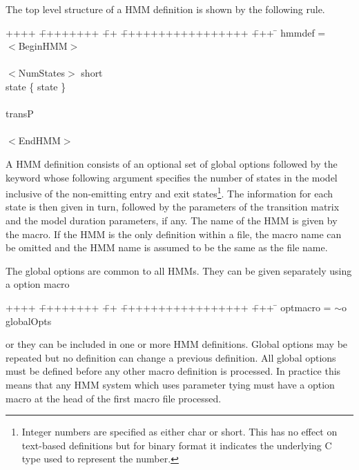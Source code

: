 The top level structure of a HMM definition is shown by the following
rule. 
{\sf
\begin{tabbing}
++++ \= ++++++++ \= ++ \= +++++++++++++++++ \= +++ \=  \kill
\>  hmmdef =  \\
\>\>         $<$BeginHMM$>$ \\
\>\>\>          [ globalOpts ] \\
\>\>\>          $<$NumStates$>$ short \\
\>\>\>          state \{ state \} \\
\>\>\>          [ regTree ] \\
\>\>\>          transP \\
\>\>\>          [ duration ] \\
\>\>         $<$EndHMM$>$ 
\end{tabbing}
}
A HMM definition consists of an optional set of global options followed by
the  keyword whose following argument specifies the number of states in 
the model inclusive of the non-emitting entry and exit states\footnote{
Integer numbers are specified as either \textsf{char} or \textsf{short}.
This has no effect on text-based definitions but for binary format it indicates
the underlying C type used to represent the number.}.
The information for each state is then given in turn, followed by the 
parameters of the transition matrix and the model duration parameters, if any.
The name of the HMM is given by the  macro.  If the HMM is the
only definition within a file, the  macro name can be omitted
and the HMM name is assumed to be the same as the file name.

The global options are common to all HMMs.  They can be given 
separately using a  option macro 
{\sf
\begin{tabbing}
++++ \= ++++++++ \= ++ \= +++++++++++++++++ \= +++ \=  \kill
\> optmacro = \> $\sim$o globalOpts 
\end{tabbing}
}
\noindent
or they can be included in one or more HMM definitions.  Global
options may be repeated but no definition can change a previous
definition.  All global options must be defined before any other
macro definition is processed.  In practice this means that any
HMM system which uses parameter tying must have a  option macro 
at the head of the first macro file processed.

